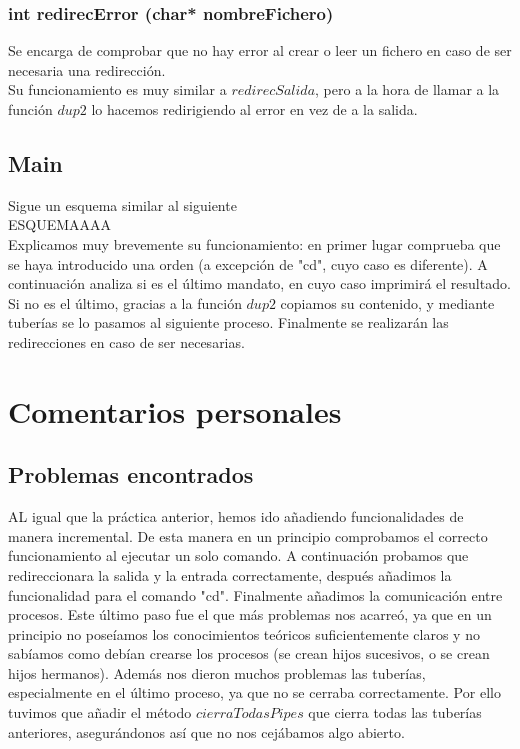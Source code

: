 \subsection{int redirecError (char* nombreFichero)}
Se encarga de comprobar que no hay error al crear o leer un fichero en caso de ser necesaria una redirección.\\
Su funcionamiento es muy similar a $redirecSalida$, pero a la hora de llamar a la función $dup2$ lo hacemos redirigiendo al error en vez de a la salida.
\section{Main}
Sigue un esquema similar al siguiente
\\
ESQUEMAAAA\\
Explicamos muy brevemente su funcionamiento: en primer lugar comprueba que se haya introducido una orden (a excepción de "cd", cuyo caso es diferente). A continuación analiza si es el último mandato, en cuyo caso imprimirá el resultado. Si no es el último, gracias a la función $dup2$ copiamos su contenido, y mediante tuberías se lo pasamos al siguiente proceso. Finalmente se realizarán las redirecciones en caso de ser necesarias.\\


\chapter{Comentarios personales}
\section{Problemas encontrados}
AL igual que la práctica anterior, hemos ido añadiendo funcionalidades de manera incremental. De esta manera en un principio comprobamos el correcto funcionamiento al ejecutar un solo comando. A continuación probamos que redireccionara la salida y la entrada correctamente, después añadimos la funcionalidad para el comando "cd". Finalmente añadimos la comunicación entre procesos. Este último paso fue el que más problemas nos acarreó, ya que en un principio no poseíamos los conocimientos teóricos suficientemente claros y no sabíamos como debían crearse los procesos (se crean hijos sucesivos, o se crean hijos hermanos). Además nos dieron muchos problemas las tuberías, especialmente en el último proceso, ya que no se cerraba correctamente. Por ello tuvimos que añadir el método $cierraTodasPipes$ que cierra todas las tuberías anteriores, asegurándonos así que no nos cejábamos algo abierto.
